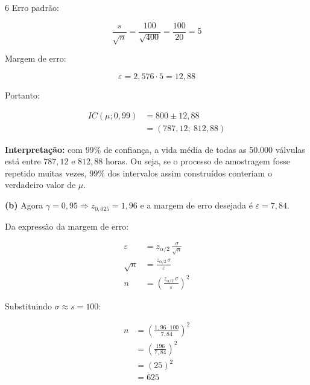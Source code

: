 \documentclass[8pt, a4paper, landscape]{extarticle}
\begin{document}
\begin{multicols}{6}
Erro padrão:

\begin{equation*}
\frac{s}{\sqrt{n}} = \frac{100}{\sqrt{400}} = \frac{100}{20} = 5
\end{equation*}

Margem de erro:

\begin{equation*}
\varepsilon = 2,576 \cdot 5 = 12,88
\end{equation*}

Portanto:

\begin{equation*}
\begin{split}
IC(\mu;0,99) &= 800 \pm 12,88 \\
&= (787,12;\ 812,88)
\end{split}
\end{equation*}

\textbf{Interpretação:} com $99\%$ de confiança, a vida média de todas as 50.000 válvulas está entre $787,12$ e $812,88$ horas. Ou seja, se o processo de amostragem fosse repetido muitas vezes, $99\%$ dos intervalos assim construídos conteriam o verdadeiro valor de $\mu$.

\vspace{0.2cm}

\textbf{(b)} Agora $\gamma = 0,95 \Rightarrow z_{0,025} = 1,96$ e a margem de erro desejada é $\varepsilon = 7,84$.

Da expressão da margem de erro:

\begin{equation*}
\begin{split}
\varepsilon &= z_{\alpha/2}\,\frac{\sigma}{\sqrt{n}} \\
\sqrt{n} &= \frac{z_{\alpha/2}\,\sigma}{\varepsilon} \\
n &= \left(\frac{z_{\alpha/2}\,\sigma}{\varepsilon}\right)^2
\end{split}
\end{equation*}

Substituindo $\sigma \approx s = 100$:

\begin{equation*}
\begin{split}
n &= \left(\frac{1,96 \cdot 100}{7,84}\right)^2 \\
&= \left(\frac{196}{7,84}\right)^2 \\
&= (25)^2 \\
&= 625
\end{split}
\end{equation*}


\end{multicols}
\end{document}
